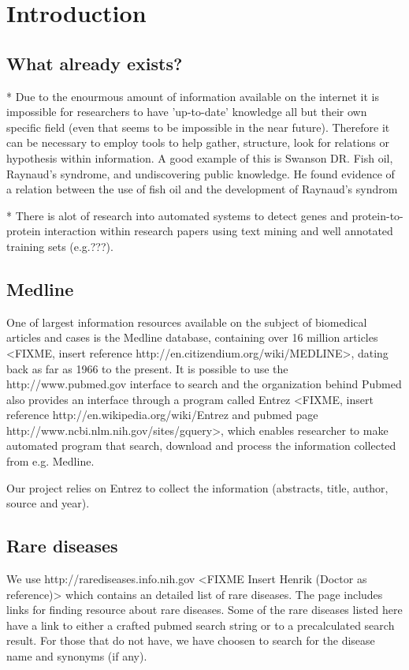 \section{Introduction}


\subsection{What already exists?}
* Due to the enourmous amount of information available on the internet it is impossible for researchers to have 'up-to-date' knowledge all but their own specific field (even that seems to be impossible in the near future). Therefore it can be necessary to employ tools to help gather, structure, look for relations or hypothesis within information. A good example of this is Swanson DR. Fish oil, Raynaud's syndrome, and undiscovering public knowledge. He found evidence of a relation between the use of fish oil and the development of Raynaud's syndrom

* There is alot of research into automated systems to detect genes and protein-to-protein interaction within research papers using text mining and well annotated training sets (e.g.???). 

\subsection{Medline}
One of largest information resources available on the subject of biomedical articles and cases is the Medline database, containing over 16 million articles <FIXME, insert reference http://en.citizendium.org/wiki/MEDLINE>, dating back as far as 1966 to the present. It is possible to use the http://www.pubmed.gov interface to search and the organization behind Pubmed also provides an interface through a program called Entrez <FIXME, insert reference http://en.wikipedia.org/wiki/Entrez and pubmed page http://www.ncbi.nlm.nih.gov/sites/gquery>, which enables researcher to make automated program that search, download and process the information collected from e.g. Medline.

Our project relies on Entrez to collect the information (abstracts, title, author, source and year). 

\subsection{Rare diseases}
We use http://rarediseases.info.nih.gov <FIXME Insert Henrik (Doctor as reference)> which contains an detailed list of rare diseases. The page includes links for finding resource about rare diseases. Some of the rare diseases listed here have a link to either a crafted pubmed search string or to a precalculated search result. For those that do not have, we have choosen to search for the disease name and synonyms (if any).

